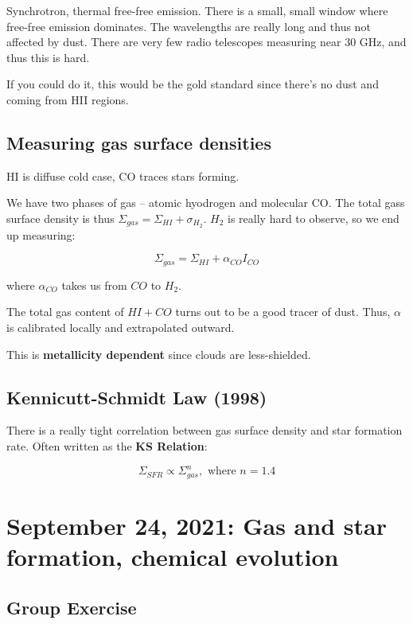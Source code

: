 \documentclass{article}
\begin{document}
Synchrotron, thermal free-free emission. There is a small, small window where free-free emission dominates. The wavelengths are really long and thus not affected by dust. There are very few radio telescopes measuring near $30$ GHz, and thus this is hard.

If you could do it, this would be the gold standard since there's no dust and coming from HII regions. 

\subsection{Measuring gas surface densities}

HI is diffuse cold case, CO traces stars forming.

We have two phases of gas -- atomic hyodrogen and molecular CO. The total gass surface density is thus $\Sigma_{gas} = \Sigma_{HI} + \sigma_{H_2}$. $H_2$ is really hard to observe, so we end up measuring:

\begin{equation}
    \Sigma_{gas} = \Sigma_{HI} + \alpha_{CO} I_{CO}
\end{equation}

where $\alpha_{CO}$ takes us from $CO$ to $H_2$. 

The total gas content of $HI + CO$ turns out to be a good tracer of dust. Thus, $\alpha$ is calibrated locally and extrapolated outward. 

This is \textbf{metallicity dependent} since clouds are less-shielded.

\subsection{Kennicutt-Schmidt Law (1998)}

There is a really tight correlation between gas surface density and star formation rate. Often written as the \textbf{KS Relation}:

\begin{equation}
    \Sigma_{SFR} \propto \Sigma_{gas}^n, \text{ where } n = 1.4
\end{equation}




\section{September 24, 2021: Gas and star formation, chemical evolution}

\subsection{Group Exercise}
\end{document}
